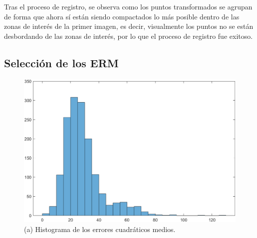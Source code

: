 \documentclass[11pt, letterpaper]{article}
\begin{document}
Tras el proceso de registro, se observa como los puntos transformados se agrupan de forma que ahora sí están siendo compactados lo más posible dentro de las zonas de interés de la primer imagen, es decir, visualmente los puntos no se están desbordando de las zonas de interés, por lo que el proceso de registro fue exitoso.


\newpage

\subsection{Selección de los ERM}

\begin{figure}[h!]
	\centering
	\begin{minipage}{0.5\textwidth}
		\centering
		\includegraphics[width=\textwidth]{IMG/R4.png}
		\caption*{(a) Histograma de los errores cuadráticos medios.}
	\end{minipage}\hfill
	\begin{minipage}{0.25\textwidth}
		\centering

\end{minipage}
\end{figure}
\end{document}

